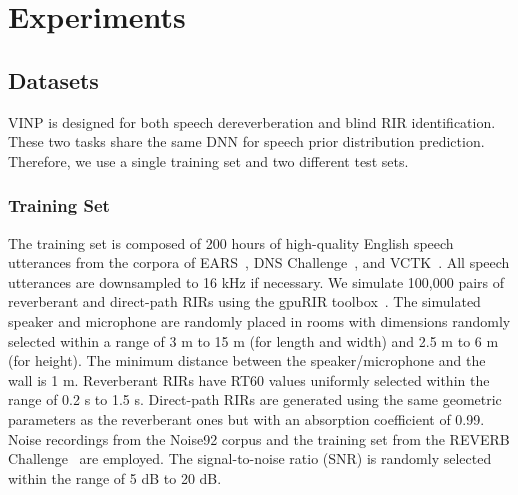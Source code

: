 \section{Experiments}
\label{sec:expset}


\subsection{Datasets}
VINP is designed for both speech dereverberation and blind RIR identification.
These two tasks share the same DNN for speech prior distribution prediction.
Therefore, we use a single training set and two different test sets.
\subsubsection{{Training Set}}
The training set is composed of 200 hours of high-quality English speech utterances from the corpora of EARS~\cite{richter2024ears}, DNS Challenge~\cite{dubey2023icassp}, and VCTK~\cite{valentini2016investigating}. 
All speech utterances are downsampled to 16 kHz if necessary. 
We simulate 100,000 pairs of reverberant and direct-path RIRs using the gpuRIR toolbox~\cite{diaz2021gpurir}.
The simulated speaker and microphone are randomly placed in rooms with dimensions randomly selected within a range of 3 m to 15 m (for length and width) and 2.5 m to 6 m (for height).
The minimum distance between the speaker/microphone and the wall is 1 m. 
Reverberant RIRs have RT60 values uniformly selected within the range of 0.2 s to 1.5 s. 
Direct-path RIRs are generated using the same geometric parameters as the reverberant ones but with an absorption coefficient of 0.99.
Noise recordings from the Noise92 corpus and the training set from the REVERB Challenge~\cite{kinoshita2013reverb} are employed.
The signal-to-noise ratio (SNR) is randomly selected within the range of 5 dB to 20 dB.





